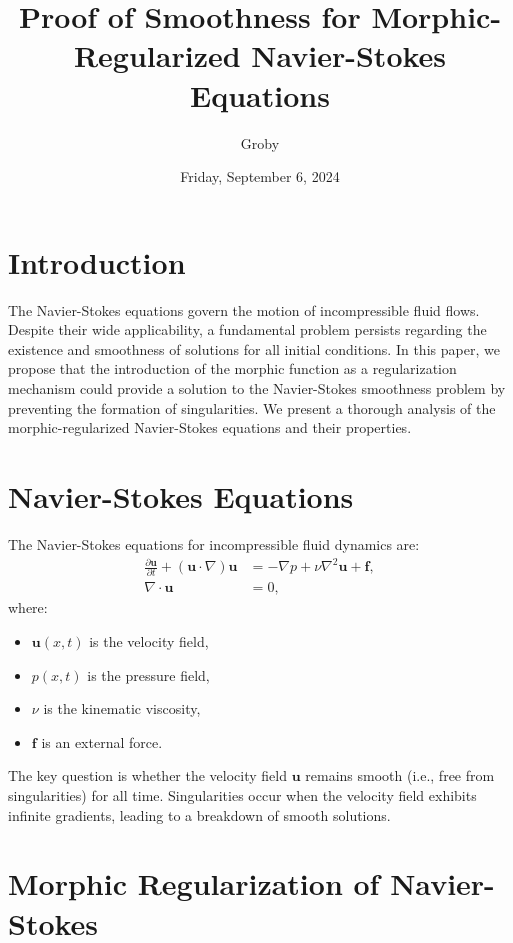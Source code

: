 \documentclass{article}
\title{Proof of Smoothness for Morphic-Regularized Navier-Stokes Equations}
\author{Groby}
\date{Friday, September 6, 2024}
\begin{document}
\maketitle

\section*{Introduction}

The Navier-Stokes equations govern the motion of incompressible fluid flows. Despite their wide applicability, a fundamental problem persists regarding the existence and smoothness of solutions for all initial conditions. In this paper, we propose that the introduction of the morphic function as a regularization mechanism could provide a solution to the Navier-Stokes smoothness problem by preventing the formation of singularities. We present a thorough analysis of the morphic-regularized Navier-Stokes equations and their properties.

\section{Navier-Stokes Equations}

The Navier-Stokes equations for incompressible fluid dynamics are:
\begin{align}
    \frac{\partial \mathbf{u}}{\partial t} + (\mathbf{u} \cdot \nabla) \mathbf{u} &= -\nabla p + \nu \nabla^2 \mathbf{u} + \mathbf{f}, \\
    \nabla \cdot \mathbf{u} &= 0,
\end{align}
where:
\begin{itemize}
    \item \( \mathbf{u}(x, t) \) is the velocity field,
    \item \( p(x, t) \) is the pressure field,
    \item \( \nu \) is the kinematic viscosity,
    \item \( \mathbf{f} \) is an external force.
\end{itemize}
The key question is whether the velocity field \( \mathbf{u} \) remains smooth (i.e., free from singularities) for all time. Singularities occur when the velocity field exhibits infinite gradients, leading to a breakdown of smooth solutions.

\section{Morphic Regularization of Navier-Stokes}
\end{document}
